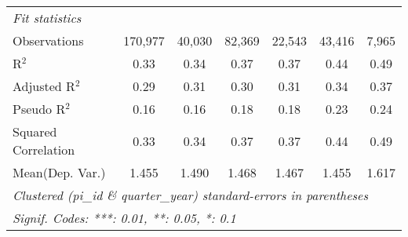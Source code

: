 \begin{tabular}{lcccccc}
   \midrule
   \emph{Fit statistics}\\
   Observations                                               & 170,977 & 40,030        & 82,369  & 22,543        & 43,416        & 7,965\\  
   R$^2$                                                      & 0.33    & 0.34          & 0.37    & 0.37          & 0.44          & 0.49\\  
   Adjusted R$^2$                                             & 0.29    & 0.31          & 0.30    & 0.31          & 0.34          & 0.37\\  
   Pseudo R$^2$                                               & 0.16    & 0.16          & 0.18    & 0.18          & 0.23          & 0.24\\  
   Squared Correlation                                        & 0.33    & 0.34          & 0.37    & 0.37          & 0.44          & 0.49\\  
Mean(Dep. Var.) & 1.455 & 1.490 & 1.468 & 1.467 & 1.455 & 1.617 \\
   \midrule \midrule
   \multicolumn{7}{l}{\emph{Clustered (pi\_id \& quarter\_year) standard-errors in parentheses}}\\
   \multicolumn{7}{l}{\emph{Signif. Codes: ***: 0.01, **: 0.05, *: 0.1}}\\
\end{tabular}
\par\endgroup
